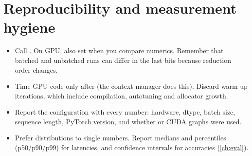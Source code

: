 \section{Reproducibility and measurement hygiene}

\begin{itemize}
  \item Call . On GPU, also set
         when you compare numerics. Remember that
        batched and unbatched runs can differ in the last bits because reduction order changes.
  \item Time GPU code only after  (the 
        context manager does this). Discard warm-up iterations, which include compilation,
        autotuning and allocator growth.
  \item Report the configuration with every number: hardware, dtype, batch size, sequence
        length, PyTorch version, and whether  or CUDA graphs were used.
  \item Prefer distributions to single numbers. Report medians and percentiles (p50/p90/p99)
        for latencies, and confidence intervals for accuracies (\cref{ch:eval}).
\end{itemize}
